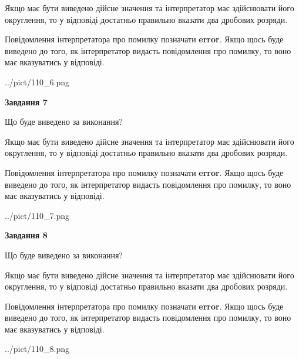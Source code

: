 \documentclass[12pt, ukrainian]{article}
\begin{document}
{\begin {Large}
Якщо має бути виведено дійсне значення та інтерпретатор має здійснювати його округлення, 
то у відповіді достатньо правильно вказати два дробових розряди.

Повідомлення інтерпретатора про помилку позначати \textbf{error}.
Якщо щось буде виведено до того, як інтерпретатор видасть повідомлення про помилку, 
то воно має вказуватись у відповіді. \par

\begin{center}
	{../pict/110_6.png}
\end{center}
\newpage

{\begin {center}\textbf{Завдання 7}\end {center}}\par
Що буде виведено за виконання? \par

Якщо має бути виведено дійсне значення та інтерпретатор має здійснювати його округлення, 
то у відповіді достатньо правильно вказати два дробових розряди.

Повідомлення інтерпретатора про помилку позначати \textbf{error}.
Якщо щось буде виведено до того, як інтерпретатор видасть повідомлення про помилку, 
то воно має вказуватись у відповіді. \par

\begin{center}
	{../pict/110_7.png}
\end{center}
\newpage

{\begin {center}\textbf{Завдання 8}\end {center}}\par
Що буде виведено за виконання? \par

Якщо має бути виведено дійсне значення та інтерпретатор має здійснювати його округлення, 
то у відповіді достатньо правильно вказати два дробових розряди.

Повідомлення інтерпретатора про помилку позначати \textbf{error}.
Якщо щось буде виведено до того, як інтерпретатор видасть повідомлення про помилку, 
то воно має вказуватись у відповіді. \par

\begin{center}
	{../pict/110_8.png}
\end{center}
\newpage


\end{Large}}
\end{document}
